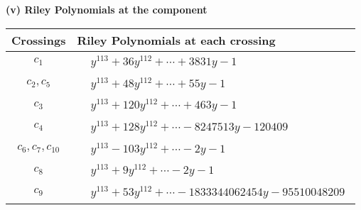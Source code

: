 \documentclass[1p]{elsarticle_modified}
\theoremstyle{definition}
\begin{document}
\newpage\renewcommand{\arraystretch}{1}
\flushleft \textbf{(v) Riley Polynomials at the component}\newline \\
\begin{tabular}{m{50pt}|m{274pt}}
Crossings & \hspace{64pt}Riley Polynomials at each crossing \\
\hline $$\begin{aligned}c_{1}\end{aligned}$$&$\begin{aligned}
&y^{113}+36 y^{112}+\cdots+3831 y-1
\end{aligned}$\\
\hline $$\begin{aligned}c_{2},c_{5}\end{aligned}$$&$\begin{aligned}
&y^{113}+48 y^{112}+\cdots+55 y-1
\end{aligned}$\\
\hline $$\begin{aligned}c_{3}\end{aligned}$$&$\begin{aligned}
&y^{113}+120 y^{112}+\cdots+463 y-1
\end{aligned}$\\
\hline $$\begin{aligned}c_{4}\end{aligned}$$&$\begin{aligned}
&y^{113}+128 y^{112}+\cdots-8247513 y-120409
\end{aligned}$\\
\hline $$\begin{aligned}c_{6},c_{7},c_{10}\end{aligned}$$&$\begin{aligned}
&y^{113}-103 y^{112}+\cdots-2 y-1
\end{aligned}$\\
\hline $$\begin{aligned}c_{8}\end{aligned}$$&$\begin{aligned}
&y^{113}+9 y^{112}+\cdots-2 y-1
\end{aligned}$\\
\hline $$\begin{aligned}c_{9}\end{aligned}$$&$\begin{aligned}
&y^{113}+53 y^{112}+\cdots-1833344062454 y-95510048209
\end{aligned}$\\

\end{tabular}
\end{document}
